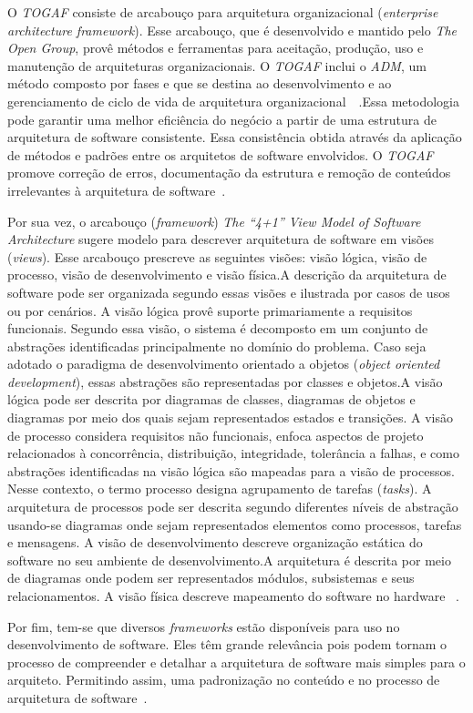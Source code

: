 O \emph{\acrfull{TOGAF}} consiste de arcabouço para arquitetura organizacional (\emph{enterprise architecture framework}). Esse arcabouço, que é desenvolvido e mantido pelo \emph{The Open Group}, provê métodos e ferramentas para aceitação, produção, uso e manutenção de arquiteturas organizacionais. O \emph{\acrfull{TOGAF}} inclui o \emph{\acrfull{ADM}}, um método composto por fases e que se destina ao desenvolvimento e ao gerenciamento de ciclo de vida de arquitetura organizacional~\cite{ISO_42010}~\cite{Togaf}.Essa metodologia  pode garantir uma melhor eficiência do negócio a partir de uma estrutura de arquitetura de software consistente. Essa consistência obtida através da aplicação de métodos e padrões entre os arquitetos de software envolvidos. O \emph{\acrfull{TOGAF}} promove correção de erros, documentação da estrutura e remoção de conteúdos irrelevantes à arquitetura de software~\cite{Togaf}.

Por sua vez, o arcabouço (\emph{framework}) \emph{The “4+1” View Model of Software Architecture} sugere modelo para descrever arquitetura de software em visões (\emph{views}). 
Esse arcabouço prescreve as seguintes visões: visão lógica, visão de processo, visão de desenvolvimento e visão física.A descrição da arquitetura de software pode ser organizada segundo essas visões e ilustrada por casos de usos ou por cenários.
A visão lógica provê suporte primariamente a requisitos funcionais. Segundo essa visão, o sistema é decomposto em um conjunto de abstrações identificadas principalmente no domínio do problema. Caso seja adotado o paradigma de desenvolvimento orientado a objetos (\emph{object oriented development}), essas abstrações são representadas por classes e objetos.A visão lógica pode ser descrita por diagramas de classes, diagramas de objetos e diagramas por meio dos quais sejam representados estados e transições.
A visão de processo considera requisitos não funcionais, enfoca aspectos de projeto relacionados à concorrência, distribuição, integridade, tolerância a falhas, e como abstrações identificadas na visão lógica são mapeadas para a visão de processos. Nesse contexto, o termo processo designa agrupamento de tarefas (\emph{tasks}).
A arquitetura de processos pode ser descrita segundo diferentes níveis de abstração usando-se diagramas onde sejam representados elementos como processos, tarefas e mensagens.
A visão de desenvolvimento descreve organização estática do software no seu ambiente de desenvolvimento.A arquitetura é descrita por meio de diagramas onde podem ser representados módulos, subsistemas e seus relacionamentos.
A visão física descreve mapeamento do software no hardware ~\cite{4plus1}. 

Por fim, tem-se que diversos \emph{frameworks} estão disponíveis para uso no desenvolvimento de software. Eles têm grande relevância pois podem tornam o processo de compreender e detalhar a arquitetura de software mais simples para o arquiteto. Permitindo assim, uma padronização no conteúdo e no processo de arquitetura de software~\cite{ISO_42010}.
